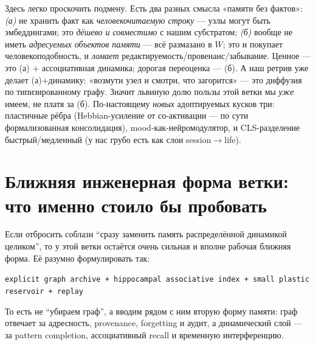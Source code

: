 \begin{principle}
Здесь легко проскочить подмену. Есть два разных смысла «памяти без фактов»:
\emph{(а)} не хранить факт как \emph{человекочитаемую строку} — узлы могут быть эмбеддингами;
это \emph{дёшево и совместимо} с нашим субстратом; \emph{(б)} вообще не иметь \emph{адресуемых
объектов памяти} — всё размазано в $W$; это и покупает человекоподобность, и \emph{ломает}
редактируемость/провенанс/забывание. Ценное — это (а) $+$ ассоциативная динамика; дорогая
переоценка — (б). А наш ретрив уже делает (а)$+$динамику: «возмути узел и смотри, что
загорится» — это диффузия по типизированному графу. Значит львиную долю пользы этой ветки мы
\emph{уже} имеем, не платя за (б). По-настоящему \emph{новых} адоптируемых кусков три:
пластичные рёбра (Hebbian-усиление от со-активации — по сути формализованная консолидация),
mood-как-нейромодулятор, и CLS-разделение быстрый/медленный (у нас грубо есть как слои
session$\to$life).
\end{principle}

\section{Ближняя инженерная форма ветки: что именно стоило бы пробовать}

Если отбросить соблазн ``сразу заменить память распределённой динамикой
целиком'', то у этой ветки остаётся очень сильная и вполне рабочая ближняя
форма. Её разумно формулировать так:

\begin{center}
\texttt{explicit graph archive + hippocampal associative index + small plastic reservoir + replay}
\end{center}

То есть не ``убираем граф'', а вводим рядом с ним вторую форму памяти: граф
отвечает за адресность, provenance, forgetting и аудит, а динамический слой
--- за pattern completion, ассоциативный recall и временную интерференцию.

